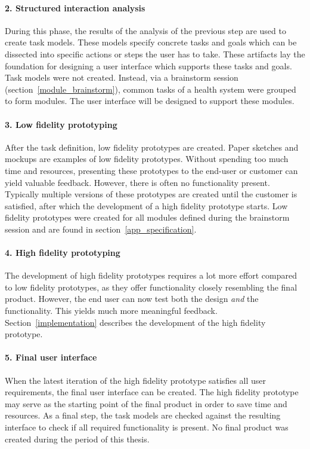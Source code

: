         \paragraph{2. Structured interaction analysis} During this phase, the results of the analysis of the previous step are used to create task models. These models specify concrete tasks and goals which can be dissected into specific actions or steps the user has to take. These artifacts lay the foundation for designing a user interface which supports these tasks and goals. Task models were not created. Instead, via a brainstorm session (section~\ref{module_brainstorm}), common tasks of a health system were grouped to form modules. The user interface will be designed to support these modules.

        \paragraph{3. Low fidelity prototyping} After the task definition, low fidelity prototypes are created. Paper sketches and mockups are examples of low fidelity prototypes. Without spending too much time and resources, presenting these prototypes to the end-user or customer can yield valuable feedback. However, there is often no functionality present. Typically multiple versions of these prototypes are created until the customer is satisfied, after which the development of a high fidelity prototype starts. Low fidelity prototypes were created for all modules defined during the brainstorm session and are found in section~\ref{app_specification}.

        \paragraph{4. High fidelity prototyping} The development of high fidelity prototypes requires a lot more effort compared to low fidelity prototypes, as they offer functionality closely resembling the final product. However, the end user can now test both the design \emph{and} the functionality. This yields much more meaningful feedback. Section~\ref{implementation} describes the development of the high fidelity prototype.

        \paragraph{5. Final user interface} When the latest iteration of the high fidelity prototype satisfies all user requirements, the final user interface can be created. The high fidelity prototype may serve as the starting point of the final product in order to save time and resources. As a final step, the task models are checked against the resulting interface to check if all required functionality is present. No final product was created during the period of this thesis. 


